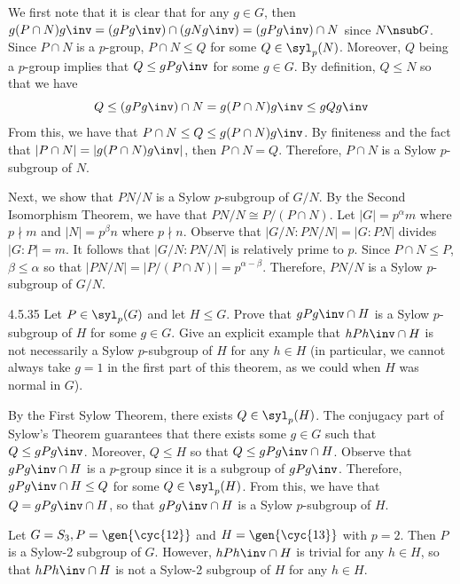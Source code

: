 \begin{sol}
	We first note that it is clear that for any $g \in G$, then $g(P \cap N)g\inv = (gPg\inv) \cap (gNg\inv) = (gPg\inv) \cap N$ since $N \nsub G$.
	Since $P \cap N$ is a $p$-group, $P \cap N \leq Q$ for some $Q \in \syl_p(N)$.
	Moreover, $Q$ being a $p$-group implies that $Q \leq gPg\inv$ for some $g \in G$.
	By definition, $Q \leq N$ so that we have
	\[
		Q \leq (gPg\inv) \cap N = g(P \cap N)g\inv \leq gQg\inv
	\]
	From this, we have that $P \cap N \leq Q \leq g(P \cap N)g\inv$.
	By finiteness and the fact that $|P \cap N| = |g(P \cap N)g\inv|$, then $P \cap N = Q$.
	Therefore, $P \cap N$ is a Sylow $p$-subgroup of $N$.

	Next, we show that $PN/N$ is a Sylow $p$-subgroup of $G/N$.
	By the Second Isomorphism Theorem, we have that $PN/N \cong P/(P \cap N)$.
	Let $|G| = p^\alpha m$ where $p \nmid m$ and $|N| = p^\beta n$ where $p \nmid n$.
	Observe that $|G/N : PN/N| = |G: PN|$ divides $|G : P| = m$.
	It follows that $|G/N : PN/N|$ is relatively prime to $p$.
	Since $P \cap N \leq P$, $\beta \leq \alpha$ so that $|PN/N| = |P/(P \cap N)| = p^{\alpha - \beta}$.
	Therefore, $PN/N$ is a Sylow $p$-subgroup of $G/N$.
\end{sol}

\begin{exercise}{4.5.35}
	Let $P \in \syl_p(G)$ and let $H \leq G$.
	Prove that $gPg\inv \cap H$ is a Sylow $p$-subgroup of $H$ for some $g \in G$.
	Give an explicit example that $hPh\inv \cap H$ is not necessarily a Sylow $p$-subgroup of $H$ for any $h \in H$ (in particular, we cannot always take $g = 1$ in the first part of this theorem, as we could when $H$ was normal in $G$).
\end{exercise}

\begin{sol}
	By the First Sylow Theorem, there exists $Q \in \syl_p(H)$.
	The conjugacy part of Sylow's Theorem guarantees that there exists some $g \in G$ such that $Q \leq gPg\inv$.
	Moreover, $Q \leq H$ so that $Q \leq gPg\inv \cap H$.
	Observe that $gPg\inv \cap H$ is a $p$-group since it is a subgroup of $gPg\inv$.
	Therefore, $gPg\inv \cap H \leq Q$ for some $Q \in \syl_p(H)$.
	From this, we have that $Q = gPg\inv \cap H$, so that $gPg\inv \cap H$ is a Sylow $p$-subgroup of $H$.

	Let $G = S_3, P = \gen{\cyc{1 2}}$ and $H = \gen{\cyc{1 3}}$ with $p = 2$.
	Then $P$ is a Sylow-2 subgroup of $G$.
	However, $hPh\inv \cap H$ is trivial for any $h \in H$, so that $hPh\inv \cap H$ is not a Sylow-2 subgroup of $H$ for any $h \in H$.
\end{sol}

